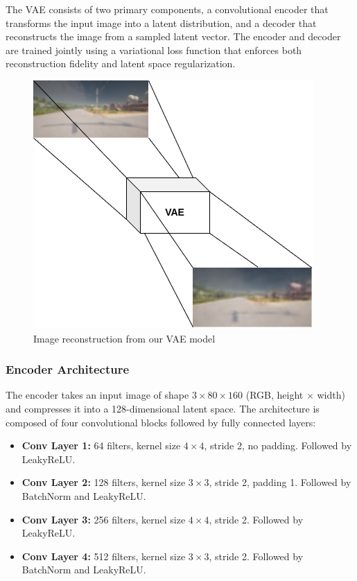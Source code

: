 The VAE consists of two primary components, a convolutional encoder that transforms the input image into a latent distribution, and a decoder that reconstructs the image from a sampled latent vector. The encoder and decoder are trained jointly using a variational loss function that enforces both reconstruction fidelity and latent space regularization.

\begin{figure}
    \centering
    \includegraphics[width=0.5\linewidth]{img/vae/image_reconstructed_from_vae.drawio.png}
    \caption{Image reconstruction from our VAE model}
    \label{fig:image_reconstruction_from_vae}
\end{figure}

\subsubsection{Encoder Architecture} \label{subsubsec:vae_encoder}

The encoder takes an input image of shape $3 \times 80 \times 160$ (RGB, height $\times$ width) and compresses it into a 128-dimensional latent space. The architecture is composed of four convolutional blocks followed by fully connected layers:

\begin{itemize}
    \item \textbf{Conv Layer 1:} 64 filters, kernel size $4 \times 4$, stride 2, no padding. Followed by LeakyReLU.
    \item \textbf{Conv Layer 2:} 128 filters, kernel size $3 \times 3$, stride 2, padding 1. Followed by BatchNorm and LeakyReLU.
    \item \textbf{Conv Layer 3:} 256 filters, kernel size $4 \times 4$, stride 2. Followed by LeakyReLU.
    \item \textbf{Conv Layer 4:} 512 filters, kernel size $3 \times 3$, stride 2. Followed by BatchNorm and LeakyReLU.
\end{itemize}

